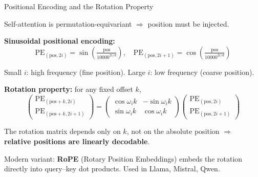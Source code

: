 \documentclass[9pt,t]{beamer}
\begin{document}
\begin{frame}[noframenumbering]{Positional Encoding and the Rotation Property}

Self-attention is permutation-equivariant $\Rightarrow$ position must be injected.

\medskip
\textbf{Sinusoidal positional encoding:}
\[
\text{PE}_{(\text{pos},2i)} = \sin\!\left(\tfrac{\text{pos}}{10000^{2i/d}}\right),
\quad
\text{PE}_{(\text{pos},2i+1)} = \cos\!\left(\tfrac{\text{pos}}{10000^{2i/d}}\right)
\]

Small $i$: high frequency (fine position). Large $i$: low frequency (coarse position).

\medskip
\textbf{Rotation property:} for any fixed offset $k$,
\[
\begin{pmatrix} \text{PE}_{(\text{pos}+k,2i)} \\ \text{PE}_{(\text{pos}+k,2i+1)} \end{pmatrix}
=
\begin{pmatrix} \cos\omega_i k & -\sin\omega_i k \\ \sin\omega_i k & \cos\omega_i k \end{pmatrix}
\begin{pmatrix} \text{PE}_{(\text{pos},2i)} \\ \text{PE}_{(\text{pos},2i+1)} \end{pmatrix}
\]

The rotation matrix depends only on $k$, not on the absolute position $\Rightarrow$
\textbf{relative positions are linearly decodable}.

\medskip
Modern variant: \textbf{RoPE} (Rotary Position Embeddings) embeds the rotation
directly into query--key dot products. Used in Llama, Mistral, Qwen.
\end{frame}
\end{document}
